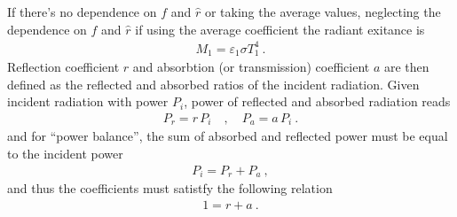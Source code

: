 \documentclass[letterpaper,10pt,english]{jupyterBook}
\begin{document}
\sphinxAtStartPar
If there’s no dependence on \(f\) and \(\hat{r}\) \sphinxhyphen{} or taking the average values, neglecting the dependence on \(f\) and \(\hat{r}\) if using the average coefficient \sphinxhyphen{} the radiant exitance is
\begin{equation*}
\begin{split}M_1 = \varepsilon_1 \sigma T_1^4 \ .\end{split}
\end{equation*}
\sphinxAtStartPar
Reflection coefficient \(r\) and absorbtion (or transmission) coefficient \(a\) are then defined as the reflected and absorbed ratios of the incident radiation. Given incident radiation with power \(P_i\), power of reflected and absorbed radiation reads
\begin{equation*}
\begin{split}P_r = r \, P_i \quad , \quad P_a = a \, P_i \ .\end{split}
\end{equation*}
\sphinxAtStartPar
and for “power balance”, the sum of absorbed and reflected power must be equal to the incident power
\begin{equation*}
\begin{split}P_i = P_r + P_a \ ,\end{split}
\end{equation*}
\sphinxAtStartPar
and thus the coefficients must satistfy the following relation  
\begin{equation*}
\begin{split}1 = r + a \ .\end{split}
\end{equation*}\label{ch/heat-transfer-radiation:example-2}
\end{document}
